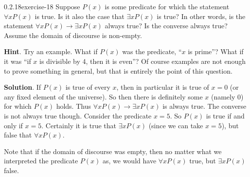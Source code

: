 \documentclass[twoside,11pt,]{book}
\numberwithin{equation}{chapter}
\newcommand{\imp}{\rightarrow}
\begin{document}
\begin{divisionsolution}{0.2.18}{}{exercise-18}%
\hypertarget{p-389}{}%
Suppose \(P(x)\) is some predicate for which the statement \(\forall x P(x)\) is true. Is it also the case that \(\exists x P(x)\) is true? In other words, is the statement \(\forall x P(x) \imp \exists x P(x)\) always true? Is the converse always true?  Assume the domain of discourse is non-empty.%
\par\smallskip%
\noindent\textbf{Hint}.\quad%
\hypertarget{p-390}{}%
Try an example.  What if \(P(x)\) was the predicate, ``\(x\) is prime''?  What if it was ``if \(x\) is divisible by 4, then it is even''?  Of course examples are not enough to prove something in general, but that is entirely the point of this question.%
\par\smallskip%
\noindent\textbf{Solution}.\quad%
\hypertarget{p-391}{}%
If \(P(x)\) is true of every \(x\), then in particular it is true of \(x = 0\) (or any fixed element of the universe). So then there is definitely some \(x\) (namely 0) for which \(P(x)\) holds. Thus \(\forall x P(x) \imp \exists x P(x)\) is always true. The converse is not always true though. Consider the predicate \(x = 5\). So \(P(x)\) is true if and only if \(x = 5\). Certainly it is true that \(\exists x P(x)\) (since we can take \(x = 5\)), but false that \(\forall x P(x)\).%
\par
\hypertarget{p-392}{}%
Note that if the domain of discourse was empty, then no matter what we interpreted the predicate \(P(x)\) as, we would have \(\forall x P(x)\) true, but \(\exists x P(x)\) false.%
\end{divisionsolution}%
\end{document}
